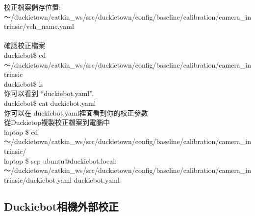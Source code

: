 \documentclass{article}
\begin{document}
校正檔案儲存位置: ～/duckietown/catkin\_ws/src/duckietown/config/baseline/calibration/camera\_intrinsic/veh\_name.yaml
\\
\\確認校正檔案
\\duckiebot\$ cd ～/duckietown/catkin\_ws/src/duckietown/config/baseline/calibration/camera\_intrinsic
\\duckiebot\$ ls
\\你可以看到 “duckiebot.yaml”.
\\duckiebot\$ cat duckiebot.yaml
\\你可以在 duckiebot.yaml裡面看到你的校正參數
\\從Duckietop複製校正檔案到電腦中
\\laptop \$ cd ～/duckietown/catkin\_ws/src/duckietown/config/baseline/calibration/camera\_intrinsic/
\\laptop \$ scp ubuntu@duckiebot.local:～/duckietown/catkin\_ws/src/duckietown/config/baseline/calibration/camera\_intrinsic/duckiebot.yaml duckiebot.yaml

\subsection{Duckiebot相機外部校正}
\end{document}
